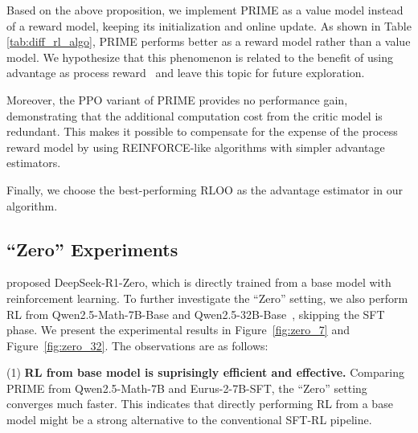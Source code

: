 Based on the above proposition, we implement PRIME as a value model instead of a reward model, keeping its initialization and online update. As shown in Table \ref{tab:diff_rl_algo}, PRIME performs better as a reward model rather than a value model. We hypothesize that this phenomenon is related to the benefit of using advantage as process reward~\cite{setlur2024rewarding} and leave this topic for future exploration. 
\fi

Moreover, the PPO variant of PRIME provides no performance gain, demonstrating that the additional computation cost from the critic model is redundant. This makes it possible to compensate for the expense of the process reward model by using REINFORCE-like algorithms with simpler advantage estimators. 

Finally, we choose the best-performing RLOO as the advantage estimator in our algorithm. 









\subsection{``Zero'' Experiments}
\label{sec:app_zero}


\citet{deepseekai2025deepseekr1incentivizingreasoningcapability} proposed DeepSeek-R1-Zero, which is directly trained from a base model with reinforcement learning. To further investigate the ``Zero'' setting, we also perform RL from Qwen2.5-Math-7B-Base and Qwen2.5-32B-Base~\citep{qwen2.5}, skipping the SFT phase. 
We present the experimental results in Figure~\ref{fig:zero_7} and Figure~\ref{fig:zero_32}. The observations are as follows:

(1) \textbf{RL from base model is suprisingly efficient and effective.} Comparing PRIME from Qwen2.5-Math-7B and Eurus-2-7B-SFT, the ``Zero'' setting converges much faster. This indicates that directly performing RL from a base model might be a strong alternative to the conventional SFT-RL pipeline.


